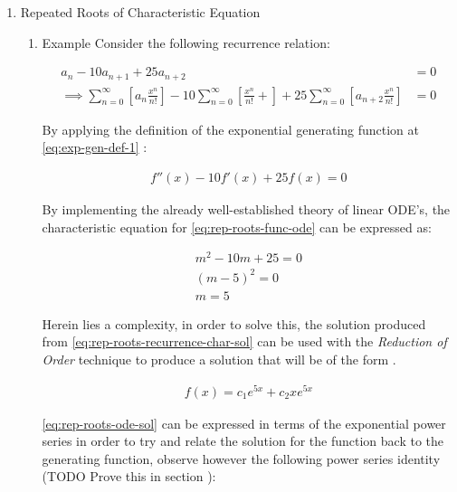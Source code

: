 \documentclass[11pt]{article}
\begin{document}
\begin{enumerate}
\item Repeated Roots of Characteristic Equation
\label{rep-roots-recurrence}
\begin{enumerate}
\item Example
\label{sec:org6eebb98}
Consider the following recurrence relation:

\begin{align}
    a_n -  10a_{n+ 1} +  25a_{n+  2}&= 0 \label{eq:hom-repeated-roots-recurrence} \\
    \implies  \sum^{\infty}_{n= 0}   {\left[{ a_n \frac{x^n}{n!} }\right]} - 10 \sum^{\infty}_{n= 0}   {\left[{ \frac{x^n}{n!}+    }\right]} + 25 \sum^{\infty}_{n= 0 }   {\left[{  a_{n+  2 }\frac{x^n}{n!} }\right]}&= 0 \nonumber
\end{align}

By applying the definition of the exponential generating function at \eqref{eq:exp-gen-def-1} :

\begin{align}
    f''{\left({ x }\right)}- 10f'{\left({ x }\right)}+  25f{\left({ x }\right)}= 0 \nonumber \label{eq:rep-roots-func-ode}
\end{align}

By implementing the already well-established theory of linear ODE's, the characteristic equation for \eqref{eq:rep-roots-func-ode} can be expressed as:

\begin{align}
    m^2- 10m+  25 = 0 \nonumber \\
    {\left({ m- 5 }\right)}^2 = 0 \nonumber \\
    m= 5 \label{eq:rep-roots-recurrence-char-sol}
\end{align}

Herein lies a complexity, in order to solve this, the solution produced from \eqref{eq:rep-roots-recurrence-char-sol} can be used with the \emph{Reduction of Order} technique to produce a solution that will be of the form \cite[]{zillMatrixExponential2009}.

\begin{align}
    f{\left({ x }\right)}= c_1e^{5x} +  c_2 x e^{5x} \label{eq:rep-roots-ode-sol}
\end{align}

\eqref{eq:rep-roots-ode-sol} can be expressed in terms of the exponential power series in order to try and relate the solution for the function back to the generating function,
observe however the following power series identity (TODO Prove this in section ):


\end{enumerate}
\end{enumerate}
\end{document}
